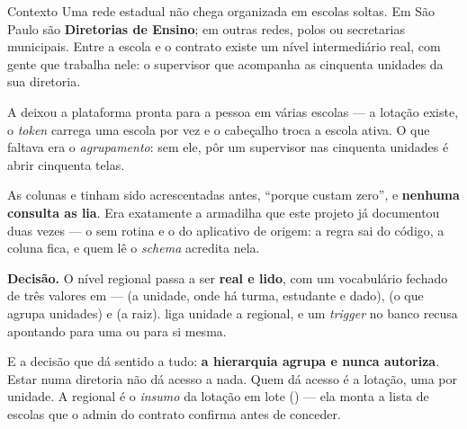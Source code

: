 \begin{especificacao}{Contexto}
Uma rede estadual não chega organizada em escolas soltas. Em São Paulo são
\textbf{Diretorias de Ensino}; em outras redes, polos ou secretarias municipais.
Entre a escola e o contrato existe um nível intermediário real, com gente que
trabalha nele: o supervisor que acompanha as cinquenta unidades da sua diretoria.

A  deixou a plataforma pronta para a pessoa em várias escolas --- a
lotação existe, o \emph{token} carrega uma escola por vez e o cabeçalho troca a
escola ativa. O que faltava era o \emph{agrupamento}: sem ele, pôr um supervisor
nas cinquenta unidades é abrir cinquenta telas.

As colunas  e  tinham sido acrescentadas
antes, \enquote{porque custam zero}, e \textbf{nenhuma consulta as lia}. Era
exatamente a armadilha que este projeto já documentou duas vezes --- o
 sem rotina e o  do aplicativo de
origem: a regra sai do código, a coluna fica, e quem lê o \emph{schema} acredita
nela.
\end{especificacao}

\textbf{Decisão.} O nível regional passa a ser \textbf{real e lido}, com um
vocabulário fechado de três valores em  ---  (a
unidade, onde há turma, estudante e dado),  (o que agrupa unidades) e
 (a raiz).  liga unidade a regional, e um \emph{trigger} no
banco recusa  apontando para uma  ou para si mesma.

E a decisão que dá sentido a tudo: \textbf{a hierarquia agrupa e nunca autoriza}.
Estar numa diretoria não dá acesso a nada. Quem dá acesso é a lotação, uma por
unidade. A regional é o \emph{insumo} da lotação em lote
() --- ela monta a lista de escolas que o
admin do contrato confirma antes de conceder.

